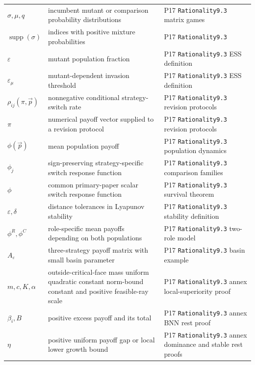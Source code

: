 \begin{longtable}{@{}p{}p{}p{}@{}}
\(\sigma,\allowbreak \mu,\allowbreak q\) & incumbent mutant or comparison probability distributions & P17 \texttt{Rationality9.\allowbreak{}3} matrix games \\
\(\operatorname{supp}(\sigma)\) & indices with positive mixture probabilities & P17 \texttt{Rationality9.\allowbreak{}3} \\
\(\varepsilon\) & mutant population fraction & P17 \texttt{Rationality9.\allowbreak{}3} ESS definition \\
\(\varepsilon_\mu\) & mutant-dependent invasion threshold & P17 \texttt{Rationality9.\allowbreak{}3} ESS definition \\
\(\rho_{ij}(\pi,\allowbreak \vec p)\) & nonnegative conditional strategy-switch rate & P17 \texttt{Rationality9.\allowbreak{}3} revision protocols \\
\(\pi\) & numerical payoff vector supplied to a revision protocol & P17 \texttt{Rationality9.\allowbreak{}3} revision protocols \\
\(\phi(\vec p)\) & mean population payoff & P17 \texttt{Rationality9.\allowbreak{}3} population dynamics \\
\(\phi_j\) & sign-preserving strategy-specific switch response function & P17 \texttt{Rationality9.\allowbreak{}3} comparison families \\
\(\phi\) & common primary-paper scalar switch response function & P17 \texttt{Rationality9.\allowbreak{}3} survival theorem \\
\(\varepsilon,\allowbreak \delta\) & distance tolerances in Lyapunov stability & P17 \texttt{Rationality9.\allowbreak{}3} stability definition \\
\(\phi^R,\allowbreak \phi^C\) & role-specific mean payoffs depending on both populations & P17 \texttt{Rationality9.\allowbreak{}3} two-\allowbreak{}role model \\
\(A_\varepsilon\) & three-strategy payoff matrix with small basin parameter & P17 \texttt{Rationality9.\allowbreak{}3} basin example \\
\(m,\allowbreak c,\allowbreak K,\allowbreak \alpha\) & outside-critical-face mass uniform quadratic constant norm-bound constant and positive feasible-ray scale & P17 \texttt{Rationality9.\allowbreak{}3} annex local-\allowbreak{}superiority proof \\
\(\beta_i,\allowbreak B\) & positive excess payoff and its total & P17 \texttt{Rationality9.\allowbreak{}3} annex BNN rest proof \\
\(\eta\) & positive uniform payoff gap or local lower growth bound & P17 \texttt{Rationality9.\allowbreak{}3} annex dominance and stable rest proofs \\

\end{longtable}

